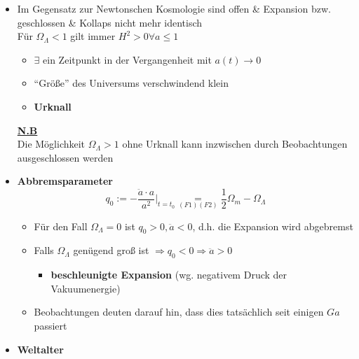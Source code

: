 \begin{itemize}
\begin{itemize}
\begin{figure}[H]
				\end{figure}
		\end{itemize}
	\item Im Gegensatz zur Newtonschen Kosmologie sind offen \& Expansion bzw. geschlossen \& Kollaps nicht mehr identisch\\
		Für $\Omega_\Lambda < 1$ gilt immer $H^2>0\forall a\leq 1$
		\begin{itemize}
			\item $\exists$ ein Zeitpunkt in der Vergangenheit mit $a(t)\to 0$
			\item "`Größe"' des Universums verschwindend klein
			\item \textbf{Urknall}
		\end{itemize}
		\textbf{\underline{N.B}}\\
		Die Möglichkeit $\Omega_\Lambda >1$ ohne Urknall kann inzwischen durch Beobachtungen ausgeschlossen werden
	\item \textbf{Abbremsparameter}
		\begin{equation*}
			q_0:=-\frac{\ddot{a}\cdot a}{a^2}\big|_{t=t_0}\underset{(F1)(F2)}{=}\frac{1}{2}\Omega_m-\Omega_\Lambda
		\end{equation*}
		\begin{itemize}[label={\textbullet}]
			\item Für den Fall $\Omega_\Lambda=0$ ist $q_0>0,\ddot{a}<0$, d.h. die Expansion wird abgebremst
			\item Falls $\Omega_\Lambda$ genügend groß ist $\Rightarrow q_0<0\Rightarrow \ddot{a}>0$
				\begin{itemize}[label={$\Rightarrow$}]
					\item \textbf{beschleunigte Expansion} (wg. negativem Druck der Vakuumenergie)
				\end{itemize}
			\item Beobachtungen deuten darauf hin, dass dies tatsächlich seit einigen $\si{Ga}$ passiert
		\end{itemize}
	\item \textbf{Weltalter}

\end{itemize}
